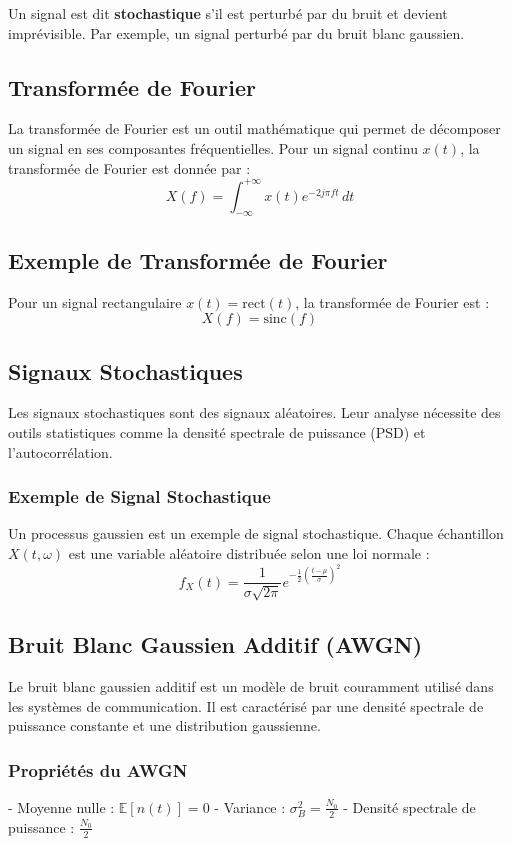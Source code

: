 \documentclass[10pt,a4paper]{article}
\begin{document}
Un signal est dit \textbf{stochastique} s'il est perturbé par du bruit et devient imprévisible. Par exemple, un signal perturbé par du bruit blanc gaussien.

\subsection*{Transformée de Fourier}
La transformée de Fourier est un outil mathématique qui permet de décomposer un signal en ses composantes fréquentielles. Pour un signal continu $x(t)$, la transformée de Fourier est donnée par :
\[ X(f) = \int_{-\infty}^{+\infty} x(t) e^{-2j\pi ft} \, dt \]

\subsection*{Exemple de Transformée de Fourier}
Pour un signal rectangulaire $x(t) = \text{rect}(t)$, la transformée de Fourier est :
\[ X(f) = \text{sinc}(f) \]

\subsection*{Signaux Stochastiques}
Les signaux stochastiques sont des signaux aléatoires. Leur analyse nécessite des outils statistiques comme la densité spectrale de puissance (PSD) et l'autocorrélation.

\subsubsection*{Exemple de Signal Stochastique}
Un processus gaussien est un exemple de signal stochastique. Chaque échantillon $X(t, \omega)$ est une variable aléatoire distribuée selon une loi normale :
\[ f_X(t) = \frac{1}{\sigma \sqrt{2\pi}} e^{-\frac{1}{2}\left(\frac{t-\mu}{\sigma}\right)^2} \]

\subsection*{Bruit Blanc Gaussien Additif (AWGN)}
Le bruit blanc gaussien additif est un modèle de bruit couramment utilisé dans les systèmes de communication. Il est caractérisé par une densité spectrale de puissance constante et une distribution gaussienne.

\subsubsection*{Propriétés du AWGN}
- Moyenne nulle : $\mathbb{E}[n(t)] = 0$
- Variance : $\sigma_B^2 = \frac{N_0}{2}$
- Densité spectrale de puissance : $\frac{N_0}{2}$
\end{document}
